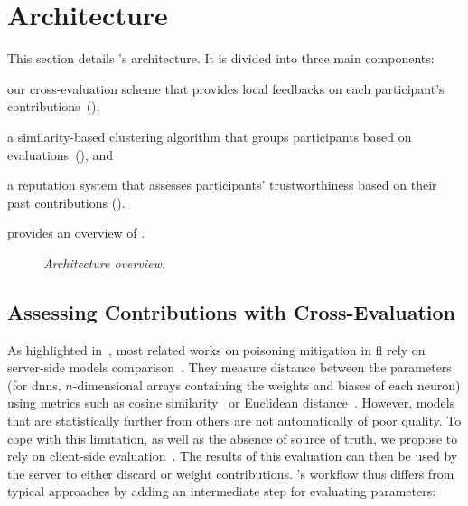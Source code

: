 \section{Architecture\label{sec:radar.archi}}

This section details \thecontrib's architecture.
It is divided into three main components:
\begin{enumerate*}[label=(\emph{\roman*})]
    \item our cross-evaluation scheme that provides local feedbacks on each participant's contributions~(),
    \item a similarity-based clustering algorithm that groups participants based on evaluations~(), and 
    \item a reputation system that assesses participants' trustworthiness based on their past contributions ().
\end{enumerate*}
 provides an overview of \thecontrib.

\begin{figure}
    \centering
    \scalebox{0.7}{
    
    }
    \caption{\label{fig:radar.archi}\emph{Architecture overview.}}
\end{figure}


\subsection{Assessing Contributions with Cross-Evaluation\label{sec:radar.archi.xeval}}

As highlighted in~, most related works on poisoning mitigation in \gls{fl} rely on server-side models comparison~\cite{fung_LimitationsFederatedLearning_2020,awan_CONTRADefendingPoisoning_2021}. 
They measure distance between the parameters (for \glspl{dnn}, $n$-dimensional arrays containing the weights and biases of each neuron) using metrics such as cosine similarity~\cite{fung_LimitationsFederatedLearning_2020} or Euclidean distance~\cite{ma_ShieldFLMitigatingModel_2022}.
However, models that are statistically further from others are not automatically of poor quality.
To cope with this limitation, as well as the absence of source of truth, we propose to rely on client-side evaluation~\cite{zhao_ShieldingCollaborativeLearning_2020}.
The results of this evaluation can then be used by the server to either discard or weight contributions.
\thecontrib's workflow thus differs from typical approaches by adding an intermediate step for evaluating parameters:

